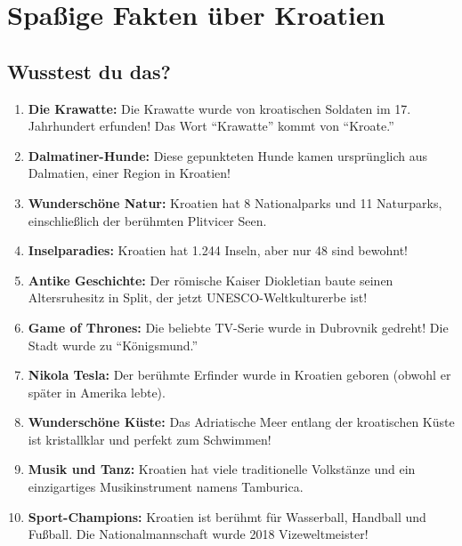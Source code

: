 \section{Spaßige Fakten über Kroatien}

\begin{culture}
\subsection*{Wusstest du das?}

\begin{enumerate}
    \item \textbf{Die Krawatte:} Die Krawatte wurde von kroatischen Soldaten im 17. Jahrhundert erfunden! Das Wort ``Krawatte'' kommt von ``Kroate.''
    
    \item \textbf{Dalmatiner-Hunde:} Diese gepunkteten Hunde kamen ursprünglich aus Dalmatien, einer Region in Kroatien!
    
    \item \textbf{Wunderschöne Natur:} Kroatien hat 8 Nationalparks und 11 Naturparks, einschließlich der berühmten Plitvicer Seen.
    
    \item \textbf{Inselparadies:} Kroatien hat 1.244 Inseln, aber nur 48 sind bewohnt!
    
    \item \textbf{Antike Geschichte:} Der römische Kaiser Diokletian baute seinen Altersruhesitz in Split, der jetzt UNESCO-Weltkulturerbe ist!
    
    \item \textbf{Game of Thrones:} Die beliebte TV-Serie wurde in Dubrovnik gedreht! Die Stadt wurde zu ``Königsmund.''
    
    \item \textbf{Nikola Tesla:} Der berühmte Erfinder wurde in Kroatien geboren (obwohl er später in Amerika lebte).
    
    \item \textbf{Wunderschöne Küste:} Das Adriatische Meer entlang der kroatischen Küste ist kristallklar und perfekt zum Schwimmen!
    
    \item \textbf{Musik und Tanz:} Kroatien hat viele traditionelle Volkstänze und ein einzigartiges Musikinstrument namens Tamburica.
    
    \item \textbf{Sport-Champions:} Kroatien ist berühmt für Wasserball, Handball und Fußball. Die Nationalmannschaft wurde 2018 Vizeweltmeister!
\end{enumerate}


\end{culture}
